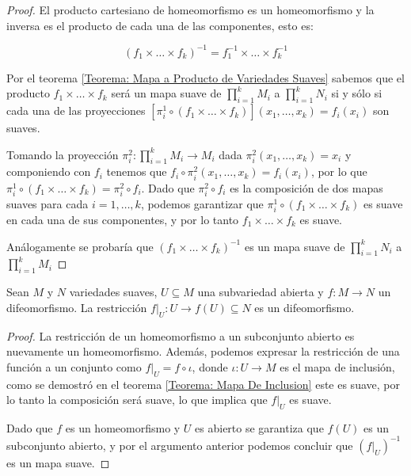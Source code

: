 \begin{proof}
  El producto cartesiano de homeomorfismo es un homeomorfismo y la inversa es el producto de cada una de las componentes, esto es:
  
  \[
    (f_1 \times \dots \times f_k)^{-1} = f_1^{-1} \times \dots \times f_k^{-1} 
  \]

  Por el teorema \ref{Teorema: Mapa a Producto de Variedades Suaves} sabemos que el producto $f_1 \times \dots \times f_k$ será un mapa suave de $\prod_{i=1}^{k} M_i$ a $\prod_{i=1}^k N_i$ si y sólo si cada una de las proyecciones $[\pi_{i}^{1} \circ (f_1 \times \dots \times f_k)](x_1,\dots,x_k) = f_i(x_i)$ son suaves.

  Tomando la proyección $\pi_{i}^2: \prod_{i=1}^k M_i \to M_i$ dada $\pi_{i}^{2}(x_1,\dots,x_k) = x_i$ y componiendo con $f_i$ tenemos que $f_i \circ \pi_{i}^2 (x_1, \dots, x_k) = f_i(x_i)$, por lo que $\pi_i^1 \circ (f_1 \times \dots \times f_k) = \pi_i^2 \circ f_i$. Dado que $\pi_i^{2} \circ f_i$ es la composición de dos mapas suaves para cada $i=1,\dots,k$, podemos garantizar que $\pi_i^1 \circ (f_1 \times \dots \times f_k)$ es suave en cada una de sus componentes, y por lo tanto $f_1 \times \dots \times f_k$ es suave.

  Análogamente se probaría que $(f_1 \times \dots \times f_k)^{-1}$ es un mapa suave de $\prod_{i=1}^k N_i$ a $\prod_{i=1}^k M_i$ 
\end{proof}

\begin{theorem}
  Sean $M$ y $N$ variedades suaves, $U \subseteq M$ una subvariedad abierta y $f: M \to N$ un difeomorfismo. La restricción $f|_{U}: U \to f(U) \subseteq N$ es un difeomorfismo.
\end{theorem}

\begin{proof}
  La restricción de un homeomorfismo a un subconjunto abierto es nuevamente un homeomorfismo. Además, podemos expresar la restricción de una función a un conjunto como $f|_U = f \circ \iota$, donde $\iota: U \to M$ es el mapa de inclusión, como se demostró en el teorema \ref{Teorema: Mapa De Inclusion} este es suave, por lo tanto la composición será suave, lo que implica que $f|_U$ es suave.

  Dado que $f$ es un homeomorfismo y $U$ es abierto se garantiza que $f(U)$ es un subconjunto abierto, y por el argumento anterior podemos concluir que $(f|_U)^{-1}$ es un mapa suave.
\end{proof}

